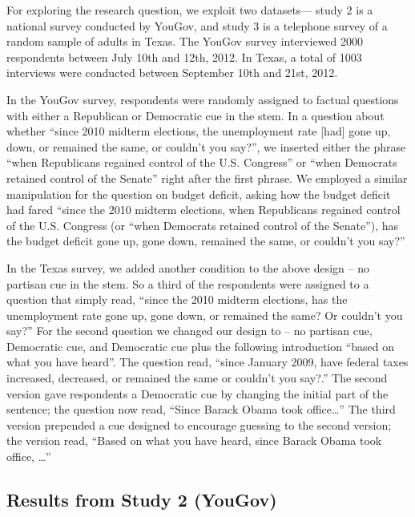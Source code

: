 \documentclass[12pt, letterpaper]{article}
\begin{document}
	For exploring the research question, we exploit two datasets--- study 2 is a national survey conducted by YouGov, and study 3 is a telephone survey of a random sample of adults in Texas. The YouGov survey interviewed 2000 respondents between July 10th and 12th, 2012.  In Texas, a total of 1003 interviews were conducted between September 10th and 21st, 2012.
	
	In the YouGov survey, respondents were randomly assigned to factual questions with either a Republican or Democratic cue in the stem. In a question about whether ``since 2010 midterm elections, the unemployment rate [had] gone up, down, or remained the same, or couldn't you say?'', we inserted either the phrase “when Republicans regained control of the U.S. Congress'' or ``when Democrats retained control of the Senate” right after the first phrase. We employed a similar manipulation for the question on budget deficit, asking how the budget deficit had fared “since the 2010 midterm elections, when Republicans regained control of the U.S. Congress (or ``when Democrats retained control of the Senate''), has the budget deficit gone up, gone down, remained the same, or couldn't you say?''
	
	In the Texas survey, we added another condition to the above design – no partisan cue in the stem. So a third of the respondents were assigned to a question that simply read, ``since the 2010 midterm elections, has the unemployment rate gone up, gone down, or remained the same?  Or couldn’t you say?'' For the second question we changed our design to – no partisan cue, Democratic cue, and Democratic cue plus the following introduction “based on what you have heard”. The question read, ``since January 2009, have federal taxes increased, decreased, or remained the same or couldn’t you say?.'' The second version gave respondents a Democratic cue by changing the initial part of the sentence; the question now read, “Since Barack Obama took office\ldots''  The third version prepended a cue designed to encourage guessing to the second version; the version read, “Based on what you have heard, since Barack Obama took office, \ldots''
	
	
	\subsection*{Results from Study 2 (YouGov)}
	
\end{document}
